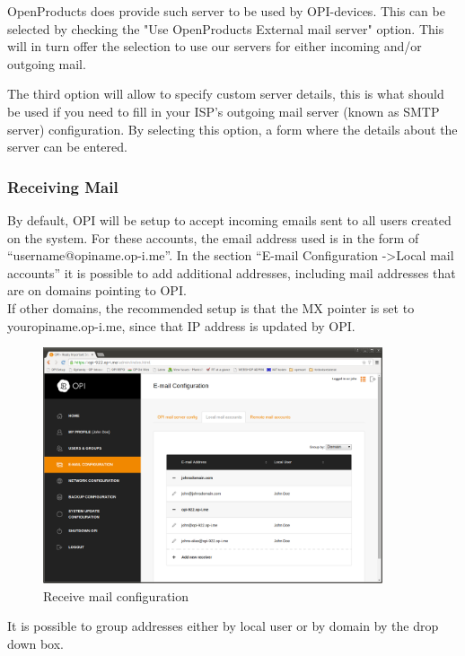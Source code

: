 \documentclass[12pt,a4paper,titlepage]{article}
\begin{document}
OpenProducts does provide such server to be used by OPI-devices. This can be selected by checking the "Use OpenProducts External mail server" option. This will in turn offer the selection to use our servers for either incoming and/or outgoing mail.

The third option will allow to specify custom server details, this is what should be used if you need to fill in your ISP's outgoing mail server (known as SMTP server) configuration. By selecting this option, a form where the details about the server can be entered.


\subsubsection{Receiving Mail}
By default, OPI will be setup to accept incoming emails sent to all users created on the system. For these accounts, the email address used is in the form of ``username@opiname.op-i.me''. In the section ``E-mail Configuration -\textgreater Local mail accounts'' it is possible to add additional addresses, including mail addresses that are on domains pointing to OPI.\\
If other domains, the recommended setup is that the MX pointer is set to youropiname.op-i.me, since that IP address is updated by OPI.
\begin{figure}[h!]
\centering
\includegraphics[width=10cm]{./img/receive-mail}
\caption{Receive mail configuration}
\end{figure}

It is possible to group addresses either by local user or by domain by the drop down box.
\end{document}
